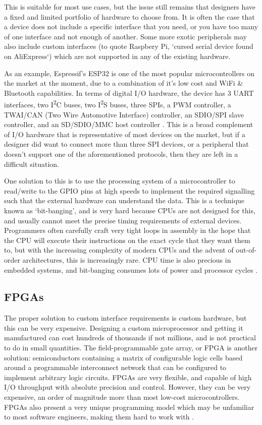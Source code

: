 This is suitable for most use cases, but the issue still remains that designers have a fixed and limited portfolio of hardware to choose from. It is often the case that a device does not include a specific interface that you need, or you have too many of one interface and not enough of another. Some more exotic peripherals may also include custom interfaces (to quote Raspbery Pi, `cursed serial device found on AliExpress`) which are not supported in any of the existing hardware.

As an example, Espressif's ESP32 is one of the most popular microcontrollers on the market at the moment, due to a combination of it's low cost and WiFi \& Bluetooth capabilities. In terms of digital I/O hardware, the device has 3 UART interfaces, two I\textsuperscript{2}C buses, two I\textsuperscript{2}S buses, three SPIs, a PWM controller, a TWAI/CAN (Two Wire Automotive Interface) controller, an SDIO/SPI slave controller, and an SD/SDIO/MMC host controller \cite{esp32}. This is a broad complement of I/O hardware that is representative of most devices on the market, but if a designer did want to connect more than three SPI devices, or a peripheral that doesn't support one of the aforementioned protocols, then they are left in a difficult situation.

One solution to this is to use the processing system of a microcontroller to read/write to the GPIO pins at high speeds to implement the required signalling such that the external hardware can understand the data. This is a technique known as `bit-banging', and is very hard because CPUs are not designed for this, and usually cannot meet the precise timing requirements of external devices. Programmers often carefully craft very tight loops in assembly in the hope that the CPU will execute their instructions on the exact cycle that they want them to, but with the increasing complexity of modern CPUs and the advent of out-of-order architectures, this is increasingly rare. CPU time is also precious in embedded systems, and bit-banging consumes lots of power and processor cycles \cite{bitbang}.

\subsection{FPGAs}

The proper solution to custom interface requirements is custom hardware, but this can be very expensive. Designing a custom microprocessor and getting it manufactured can cost hundreds of thousands if not millions, and is not practical to do in small quantities. The field-programmable gate array, or FPGA is another solution: semiconductors containing a matrix of configurable logic cells based around a programmable interconnect network that can be configured to implement arbitrary logic circuits. FPGAs are very flexible, and capable of high I/O throughput with absolute precision and control. However, they can be very expensive, an order of magnitude more than most low-cost microcontrollers. FPGAs also present a very unique programming model which may be unfamiliar to most software engineers, making them hard to work with \cite{whatisfpga}.

